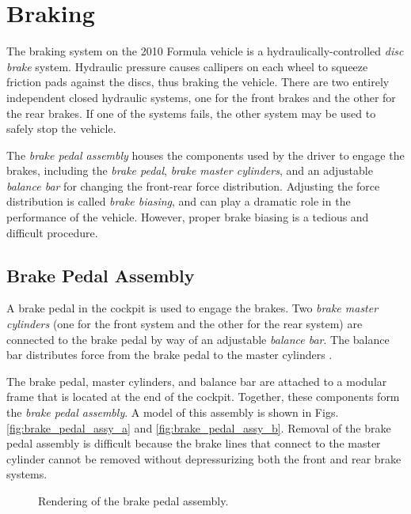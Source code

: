\section{Braking}

The braking system on the 2010 Formula vehicle is a hydraulically-controlled \emph{disc brake} system. Hydraulic pressure causes callipers on each wheel to squeeze friction pads against the discs, thus braking the vehicle. There are two entirely independent closed hydraulic systems, one for the front brakes and the other for the rear brakes. If one of the systems fails, the other system may be used to safely stop the vehicle. 

The \emph{brake pedal assembly} houses the components used by the driver to engage the brakes, including the \emph{brake pedal}, \emph{brake master cylinders}, and an adjustable \emph{balance bar} for changing the front-rear force distribution. Adjusting the force distribution is called \emph{brake biasing}, and can play a dramatic role in the performance of the vehicle. However, proper brake biasing is a tedious and difficult procedure.

\subsection{Brake Pedal Assembly}

A brake pedal in the cockpit is used to engage the brakes. Two \emph{brake master cylinders} (one for the front system and the other for the rear system) are connected to the brake pedal by way of an adjustable \emph{balance bar}. The balance bar distributes force from the brake pedal to the master cylinders \cite{TiltonBrakeBias}. 

The brake pedal, master cylinders, and balance bar are attached to a modular frame that is located at the end of the cockpit. Together, these components form the \emph{brake pedal assembly}. A model of this assembly is shown in Figs. \ref{fig:brake_pedal_assy_a} and \ref{fig:brake_pedal_assy_b}. Removal of the brake pedal assembly is difficult because the brake lines that connect to the master cylinder cannot be removed without depressurizing both the front and rear brake systems. 

\begin{figure}[h!]
	\centering
    \caption{Rendering of the brake pedal assembly.}
    \label{fig:brake_pedal_assy}
\end{figure}


